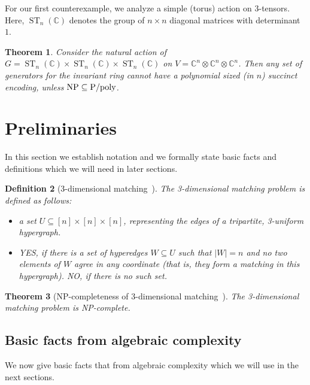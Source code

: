 \documentclass[10pt,a4paper]{article}
\newtheorem{theorem}{Theorem}
\newtheorem{definition}[theorem]{Definition}
\newcommand{\C}{\mathbb C}
\newcommand{\ST}{\operatorname{ST}}
\begin{document}
\setcounter{theorem}{7}
For our first counterexample, we analyze a simple (torus) action on $3$-tensors.
Here, $\ST_n(\C)$ denotes the group of $n\times n$ diagonal matrices with determinant $1$.

\begin{theorem}\label{thm:torus-action}
Consider the natural action of $G = \ST_n(\C) \times \ST_n(\C) \times \ST_n(\C)$ on $V = \C^n \otimes \C^n \otimes \C^n$. Then any set of generators for the invariant ring cannot have a polynomial sized (in $n$) succinct encoding, unless ${\rm NP \subseteq P/poly}$.
\end{theorem}

\setcounter{section}{1}
\section{Preliminaries}
\setcounter{theorem}{15}
%

In this section we establish notation and we formally state basic facts and definitions which
we will need in later sections.



\begin{definition}[3-dimensional matching~\cite{K72}]\label{def:3D-matching}
	The \emph{3-dimensional matching} problem is defined as follows:
	\begin{itemize}
		\item[Input:] a set $U \subseteq [n] \times [n] \times [n]$, representing the edges of
		a tripartite, 3-uniform hypergraph.
		\item[Output:] YES, if there is a set of hyperedges $W \subseteq U$ such that $|W| = n$ and
		no two elements of $W$ agree in any coordinate (that is, they form a matching in this
		hypergraph). NO, if there is no such set.
	\end{itemize}
\end{definition}

\begin{theorem}[NP-completeness of 3-dimensional matching~\cite{K72}]\label{thm:3D-matching-NP-complete}
	The 3-dimensional matching problem is NP-complete.
\end{theorem}

\subsection{Basic facts from algebraic complexity}

We now give basic facts that from algebraic complexity which we will use in the next sections.
\end{document}
